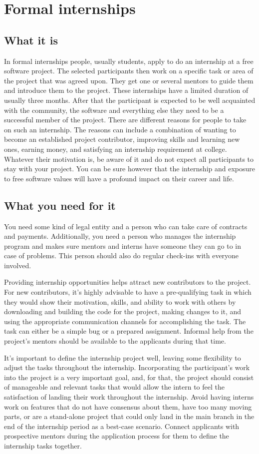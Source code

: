 \section{Formal internships}
\subsection{What it is}
In formal internships people, usually students, apply to do an internship at a free software project. The selected participants then work on a specific task or area of the project that was agreed upon. They get one or several mentors to guide them and introduce them to the project. These internships have a limited duration of usually three months. After that the participant is expected to be well acquainted with the community, the software and everything else they need to be a successful member of the project. There are different reasons for people to take on such an internship. The reasons can include a combination of wanting to become an established project contributor, improving skills and learning new ones, earning money, and satisfying an internship requirement at college. Whatever their motivation is, be aware of it and do not expect all participants to stay with your project. You can be sure however that the internship and exposure to free software values will have a profound impact on their career and life.

\subsection{What you need for it}
You need some kind of legal entity and a person who can take care of contracts and payments. Additionally, you need a person who manages the internship program and makes sure mentors and interns have someone they can go to in case of problems. This person should also do regular check-ins with everyone involved.

Providing internship opportunities helps attract new contributors to the project. For new contributors, it’s highly advisable to have a pre-qualifying task in which they would show their motivation, skills, and ability to work with others by downloading and building the code for the project, making changes to it, and using the appropriate communication channels for accomplishing the task. The task can either be a simple bug or a prepared assignment. Informal help from the project’s mentors should be available to the applicants during that time.

It’s important to define the internship project well, leaving some flexibility to adjust the tasks throughout the internship. Incorporating the participant’s work into the project is a very important goal, and, for that, the project should consist of manageable and relevant tasks that would allow the intern to feel the satisfaction of landing their work throughout the internship. Avoid having interns work on features that do not have consensus about them, have too many moving parts, or are a stand-alone project that could only land in the main branch in the end of the internship period as a best-case scenario. Connect applicants with prospective mentors during the application process for them to define the internship tasks together.

